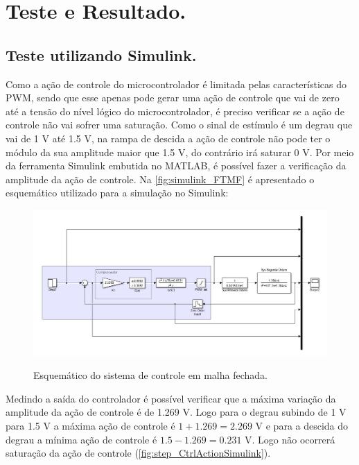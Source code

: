 \documentclass[
	article,			%
	11pt,				%
	oneside,			%
	a4paper,			%
	english,			%
	brazil,				%
	sumario=tradicional
	]{abntex2}
\begin{document}
\pagebreak

\section{\textbf{Teste e Resultado.}}

\subsection{Teste utilizando Simulink.}
Como a ação de controle do microcontrolador é limitada pelas características do PWM, sendo que esse apenas pode gerar uma ação de controle que vai de zero até a tensão do nível lógico do microcontrolador, é preciso verificar se a ação de controle não vai sofrer uma saturação.
Como o sinal de estímulo é um degrau que vai de 1 V até 1.5 V, na rampa de descida a ação de controle não pode ter o módulo da sua amplitude maior que 1.5 V, do contrário irá saturar 0 V.
Por meio da ferramenta Simulink embutida no MATLAB, é possível fazer a verificação da amplitude da ação de controle. Na \autoref{fig:simulink_FTMF} é apresentado o esquemático utilizado para a simulação no Simulink:

\begin{figure}[htb!]
	\centering
	\caption{Esquemático do sistema de controle em malha fechada.}
	\includegraphics[scale=0.40]{./img/simulink_FTMF.JPG}
	\label{fig:simulink_FTMF}
\end{figure}

Medindo a saída do controlador é possível verificar que a máxima variação da amplitude da ação de controle é de 1.269 V. Logo para o degrau subindo de 1 V para 1.5 V a máxima ação de controle é $1+1.269 = 2.269$ V e para a descida do degrau a mínima ação de controle é $1.5-1.269 = 0.231$ V. Logo não ocorrerá saturação da ação de controle (\autoref{fig:step_CtrlActionSimulink}).
\end{document}
